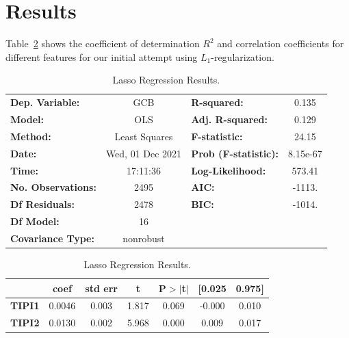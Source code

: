 \documentclass[11pt]{article}
\begin{document}
\section*{Results}
 Table~\ref{tab:lasso}
shows the coefficient of determination \(R^2\) and correlation
coefficients for different features for our initial attempt using \(L_1\)-regularization.
\begin{table}[ht]
	\centering
	\caption{Lasso Regression Results.} \label{tab:lasso}
	\vspace{1mm}
\begin{tabular}{lclc}
\toprule
\textbf{Dep. Variable:}                &       GCB        & \textbf{  R-squared:         } &     0.135   \\
\textbf{Model:}                        &       OLS        & \textbf{  Adj. R-squared:    } &     0.129   \\
\textbf{Method:}                       &  Least Squares   & \textbf{  F-statistic:       } &     24.15   \\
\textbf{Date:}                         & Wed, 01 Dec 2021 & \textbf{  Prob (F-statistic):} &  8.15e-67   \\
\textbf{Time:}                         &     17:11:36     & \textbf{  Log-Likelihood:    } &    573.41   \\
\textbf{No. Observations:}             &        2495      & \textbf{  AIC:               } &    -1113.   \\
\textbf{Df Residuals:}                 &        2478      & \textbf{  BIC:               } &    -1014.   \\
\textbf{Df Model:}                     &          16      & \textbf{                     } &             \\
\textbf{Covariance Type:}              &    nonrobust     & \textbf{                     } &             \\
\bottomrule
\end{tabular}
\begin{tabular}{lcccccc}
                                       & \textbf{coef} & \textbf{std err} & \textbf{t} & \textbf{P$> |$t$|$} & \textbf{[0.025} & \textbf{0.975]}  \\
\midrule
\textbf{TIPI1}                         &       0.0046  &        0.003     &     1.817  &         0.069        &       -0.000    &        0.010     \\
\textbf{TIPI2}                         &       0.0130  &        0.002     &     5.968  &         0.000        &        0.009    &        0.017     \\

\end{tabular}
\end{table}
\end{document}
